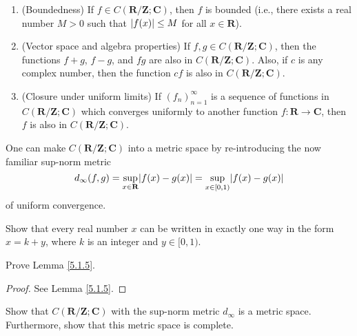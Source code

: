 \begin{lemma}\label{5.1.5}
    \quad
    \begin{enumerate}
        \item (Boundedness)
              If \(f \in C(\mathbf{R} / \mathbf{Z} ; \mathbf{C})\), then \(f\) is bounded
              (i.e., there
              exists a real number \(M > 0\) such that \(\abs*{f(x)} \leq M\) for all \(x \in \mathbf{R}\)).
        \item (Vector space and algebra properties)
              If \(f, g \in C(\mathbf{R} / \mathbf{Z} ; \mathbf{C})\), then the functions \(f + g\), \(f - g\), and \(f g\) are also in \(C(\mathbf{R} / \mathbf{Z} ; \mathbf{C})\).
              Also, if \(c\) is any complex number, then the function \(cf\) is also in \(C(\mathbf{R} / \mathbf{Z} ; \mathbf{C})\).
        \item (Closure under uniform limits)
              If \((f_n)_{n = 1}^\infty\) is a sequence of functions in \(C(\mathbf{R} / \mathbf{Z} ; \mathbf{C})\) which converges uniformly to another function \(f : \mathbf{R} \to \mathbf{C}\), then \(f\) is also in \(C(\mathbf{R} / \mathbf{Z} ; \mathbf{C})\).
    \end{enumerate}
\end{lemma}

\begin{note}
    One can make \(C(\mathbf{R} / \mathbf{Z} ; \mathbf{C})\) into a metric space by re-introducing the now familiar sup-norm metric
    \[
        d_\infty(f, g) = \sup_{x \in \mathbf{R}} \abs*{f(x) - g(x)} = \sup_{x \in [0, 1)} \abs*{f(x) - g(x)}
    \]
    of uniform convergence.
\end{note}

\exercisesection

\begin{exercise}\label{ex 5.1.1}
    Show that every real number \(x\) can be written in exactly one way in the form \(x = k + y\), where \(k\) is an integer and \(y \in [0, 1)\).
\end{exercise}

\begin{exercise}\label{ex 5.1.2}
    Prove Lemma \ref{5.1.5}.
\end{exercise}

\begin{proof}
    See Lemma \ref{5.1.5}.
\end{proof}

\begin{exercise}\label{ex 5.1.3}
    Show that \(C(\mathbf{R} / \mathbf{Z} ; \mathbf{C})\) with the sup-norm metric \(d_\infty\) is a metric space.
    Furthermore, show that this metric space is complete.
\end{exercise}